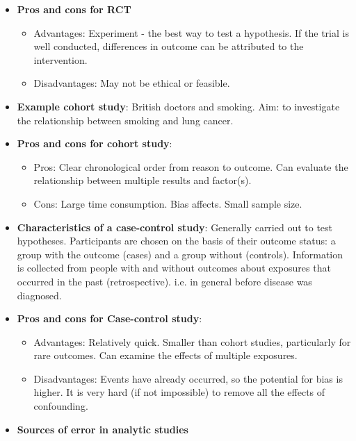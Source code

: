 \documentclass[12pt]{book}
\begin{document}
\begin{itemize}
\item \textbf{Pros and cons for RCT}
    \begin{itemize}
    \item Advantages: Experiment - the best way to test a hypothesis. If the trial is well conducted, differences in outcome can be attributed to the intervention.
    \item Disadvantages: May not be ethical or feasible.
    \end{itemize}
\item \textbf{Example cohort study}: British doctors and smoking. Aim: to investigate the relationship between smoking and lung cancer.
\item \textbf{Pros and cons for cohort study}:
    \begin{itemize}
    \item Pros: Clear chronological order from reason to outcome. Can evaluate the relationship between multiple results and factor(s).
    \item Cons: Large time consumption. Bias affects. Small sample size.
    \end{itemize}
\item \textbf{Characteristics of a case-control study}: Generally carried out to test hypotheses. Participants are chosen on the basis of their outcome status: a group with the outcome (cases) and a group without (controls). Information is collected from people with and without outcomes about exposures that occurred in the past (retrospective). i.e. in general before disease was diagnosed.
\item \textbf{Pros and cons for Case-control study}:
    \begin{itemize}
    \item Advantages: Relatively quick. Smaller than cohort studies, particularly for rare outcomes. Can examine the effects of multiple exposures.
    \item Disadvantages: Events have already occurred, so the potential for bias is higher. It is very hard (if not impossible) to remove all the effects of confounding.
    \end{itemize}
\item \textbf{Sources of error in analytic studies}


\end{itemize}
\end{document}
